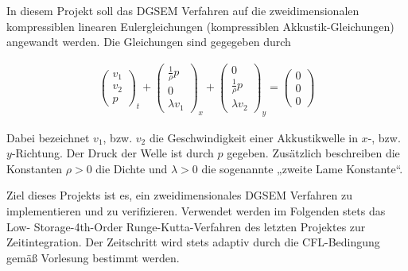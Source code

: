 In diesem Projekt soll das DGSEM Verfahren auf die zweidimensionalen
kompressiblen linearen Eulergleichungen (kompressiblen Akkustik-Gleichungen)
angewandt werden. Die Gleichungen sind gegegeben durch

\begin{align}
\begin{pmatrix}
v_1\\
v_2\\
p
\end{pmatrix}_t
+
\begin{pmatrix}
\frac{1}{\rho}p\\
0\\
\lambda v_1
\end{pmatrix}_x
+
\begin{pmatrix}
0\\
\frac{1}{\rho}p\\
\lambda v_2
\end{pmatrix}_y
=
\begin{pmatrix}
0\\
0\\
0
\end{pmatrix}
\end{align}

Dabei bezeichnet $v_1$, bzw. $v_2$ die Geschwindigkeit einer Akkustikwelle in
$x$-, bzw. $y$-Richtung. Der Druck der Welle ist durch $p$ gegeben.
Zusätzlich beschreiben die Konstanten $\rho > 0$ die Dichte und $\lambda > 0$ die
sogenannte „zweite Lame Konstante“.

Ziel dieses Projekts ist es, ein zweidimensionales DGSEM Verfahren zu
implementieren und zu verifizieren.  Verwendet werden im Folgenden stets das
Low- Storage-4th-Order Runge-Kutta-Verfahren des letzten Projektes zur
Zeitintegration. Der Zeitschritt wird stets adaptiv durch die CFL-Bedingung
gemäß Vorlesung bestimmt werden.
